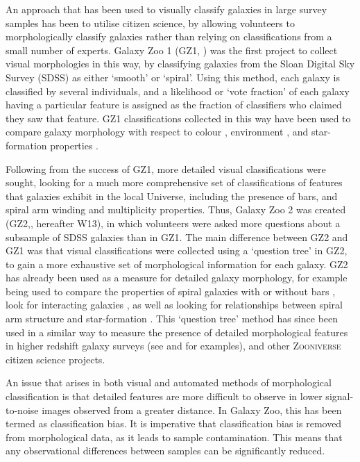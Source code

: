 \documentclass[useAMS,usenatbib]{mn2e}
\begin{document}
An approach that has been used to visually classify galaxies in large survey samples has been to utilise citizen science, by allowing volunteers to morphologically classify galaxies rather than relying on classifications from a small number of experts. Galaxy Zoo 1 (GZ1, \citealt{Lintott_08,Lintott_11}) was the first project to collect visual morphologies in this way, by classifying galaxies from the Sloan Digital Sky Survey (SDSS) as either `smooth' or `spiral'. Using this method, each galaxy is classified by several individuals, and a likelihood or `vote fraction' of each galaxy having a particular feature is assigned as the fraction of classifiers who claimed they saw that feature. GZ1 classifications collected in this way have been used to compare galaxy morphology with respect to colour \citep{Masters_10a,Masters_10b,Bamford_09}, environment \citep{Skibba_09,Bamford_09}, and star-formation properties \citep{Tojeiro_13,Schawinski_14,Smethurst_15}. 

Following from the success of GZ1, more detailed visual classifications were sought, looking for a much more comprehensive set of classifications of features that galaxies exhibit in the local Universe, including the presence of bars, and spiral arm winding and multiplicity properties. Thus, Galaxy Zoo 2 was created (GZ2,\citealt{Willett_13}, hereafter W13), in which volunteers were asked more questions about a subsample of SDSS galaxies than in GZ1. The main difference between GZ2 and GZ1 was that visual classifications were collected using a `question tree' in GZ2, to gain a more exhaustive set of morphological information for each galaxy. GZ2 has already been used as a measure for detailed galaxy morphology, for example being used to compare the properties of spiral galaxies with or without bars \citep{Masters_11,Masters_12,Cheung_13}, look for interacting galaxies \citep{Casteels_13}, as well as looking for relationships between spiral arm structure and star-formation \citep{Willett_15}. This `question tree' method has since been used in a similar way to measure the presence of detailed morphological features in higher redshift galaxy surveys (see \citealt{Melvin_14} and \citealt{Simmons_14} for examples), and other \textsc{Zooniverse} citizen science projects. 

An issue that arises in both visual and automated methods of morphological classification is that detailed features are more difficult to observe in lower signal-to-noise images observed from a greater distance. In Galaxy Zoo, this has been termed as classification bias. It is imperative that classification bias is removed from morphological data, as it leads to sample contamination. This means that any observational differences between samples can be significantly reduced.
\end{document}
